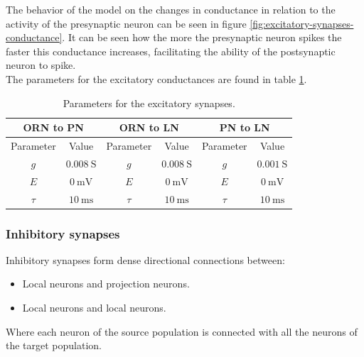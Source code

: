     The behavior of the model on the changes in conductance in relation to the activity of the presynaptic neuron can be seen in figure \ref{fig:excitatory-synapses-conductance}.
    It can be seen how the more the presynaptic neuron spikes the faster this conductance increases, facilitating the ability of the postsynaptic neuron to spike.\\
    The parameters for the excitatory conductances are found in table \ref{tab:excitatory-synapses-parameters}.

    \begin{table}
      \centering
      \begin{tabular}{ c c | c c | c c }
        \hline
        \multicolumn{2}{c}{ORN to PN} & \multicolumn{2}{c}{ORN to LN} & \multicolumn{2}{c}{PN to LN} \\
        \hline
        Parameter & Value & Parameter & Value & Parameter & Value \\
        $g$ & $\SI{0.008}{\siemens}$ & $g$ & $\SI{0.008}{\siemens}$ & $g$ & $\SI{0.001}{\siemens}$ \\
        $E$ & $\SI{0}{\milli\volt}$ & $E$ & $\SI{0}{\milli\volt}$ & $E$ & $\SI{0}{\milli\volt}$ \\
        $\tau$ & $\SI{10}{\milli\second}$ & $\tau$ & $\SI{10}{\milli\second}$ & $\tau$ & $\SI{10}{\milli\second}$ \\
        \hline
      \end{tabular}
      \caption{Parameters for the excitatory synapses.}
      \label{tab:excitatory-synapses-parameters}
    \end{table}

    \subsubsection{Inhibitory synapses}
    Inhibitory synapses form dense directional connections between:

    \begin{itemize}
      \item Local neurons and projection neurons.
      \item Local neurons and local neurons.
    \end{itemize}

    Where each neuron of the source population is connected with all the neurons of the target population.

